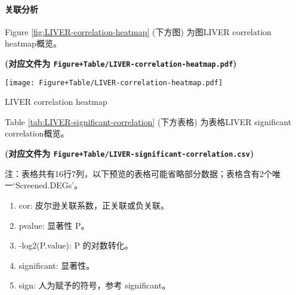 \documentclass[
]{article}
\providecommand{\tightlist}{%
  \setlength{\itemsep}{0pt}\setlength{\parskip}{0pt}}
\begin{document}
\hypertarget{ux5173ux8054ux5206ux6790}{%
\paragraph{关联分析}\label{ux5173ux8054ux5206ux6790}}

Figure \ref{fig:LIVER-correlation-heatmap} (下方图) 为图LIVER correlation heatmap概览。

\textbf{(对应文件为 \texttt{Figure+Table/LIVER-correlation-heatmap.pdf})}

\def\@captype{figure}
\begin{center}
\texttt{[image: Figure+Table/LIVER-correlation-heatmap.pdf]}
\caption{LIVER correlation heatmap}\label{fig:LIVER-correlation-heatmap}
\end{center}

Table \ref{tab:LIVER-significant-correlation} (下方表格) 为表格LIVER significant correlation概览。

\textbf{(对应文件为 \texttt{Figure+Table/LIVER-significant-correlation.csv})}

\begin{center}\begin{tcolorbox}[colback=gray!10, colframe=gray!50, width=0.9\linewidth, arc=1mm, boxrule=0.5pt]注：表格共有16行7列，以下预览的表格可能省略部分数据；表格含有2个唯一`Screened.DEGs'。
\end{tcolorbox}
\end{center}
\begin{center}\begin{tcolorbox}[colback=gray!10, colframe=gray!50, width=0.9\linewidth, arc=1mm, boxrule=0.5pt]\begin{enumerate}\tightlist
\item cor:  皮尔逊关联系数，正关联或负关联。
\item pvalue:  显著性 P。
\item -log2(P.value):  P 的对数转化。
\item significant:  显著性。
\item sign:  人为赋予的符号，参考 significant。
\end{enumerate}\end{tcolorbox}
\end{center}
\end{document}

